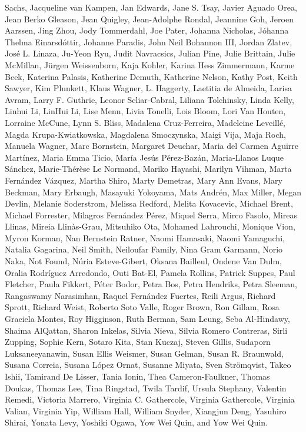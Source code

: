 \documentclass[
]{article}
\begin{document}
Sachs, Jacqueline van Kampen, Jan Edwards, Jane S. Tsay, Javier Aguado
Orea, Jean Berko Gleason, Jean Quigley, Jean-Adolphe Rondal, Jeannine
Goh, Jeroen Aarssen, Jing Zhou, Jody Tommerdahl, Joe Pater, Johanna
Nicholas, Jóhanna Thelma Einarsdóttir, Johanne Paradis, John Neil
Bohannon III, Jordan Zlatev, José L. Linaza, Ju-Yeon Ryu, Judit
Navracsics, Julian Pine, Julie Brittain, Julie McMillan, Jürgen
Weissenborn, Kaja Kohler, Karina Hess Zimmermann, Karme Beek, Katerina
Palasis, Katherine Demuth, Katherine Nelson, Kathy Post, Keith Sawyer,
Kim Plunkett, Klaus Wagner, L. Haggerty, Laetitia de Almeida, Larisa
Avram, Larry F. Guthrie, Leonor Scliar-Cabral, Liliana Tolchinsky, Linda
Kelly, Linhui Li, LinHui Li, Lise Menn, Livia Tonelli, Lois Bloom, Lori
Van Houten, Lorraine McCune, Lynn S. Bliss, Madalena Cruz-Ferreira,
Madeleine Leveillé, Magda Krupa-Kwiatkowska, Magdalena Smoczynska, Maigi
Vija, Maja Roch, Manuela Wagner, Marc Bornstein, Margaret Deuchar, Maria
del Carmen Aguirre Martínez, Maria Emma Ticio, María Jesús Pérez-Bazán,
Maria-Llanos Luque Sánchez, Marie-Thérèse Le Normand, Mariko Hayashi,
Marilyn Vihman, Marta Fernández Vázquez, Martha Shiro, Marty Demetras,
Mary Ann Evans, Mary Beckman, Mary Erbaugh, Masayuki Yokoyama, Mats
Andrén, Max Miller, Megan Devlin, Melanie Soderstrom, Melissa Redford,
Melita Kovacevic, Michael Brent, Michael Forrester, Milagros Fernández
Pérez, Miquel Serra, Mirco Fasolo, Mireas Llinas, Mireia Llinàs-Grau,
Mitsuhiko Ota, Mohamed Lahrouchi, Monique Vion, Myron Korman, Nan
Bernstein Ratner, Naomi Hamasaki, Naomi Yamaguchi, Natalia Gagarina,
Neil Smith, Neiloufar Family, Nina Gram Garmann, Norio Naka, Not Found,
Núria Esteve-Gibert, Oksana Bailleul, Ondene Van Dulm, Oralia Rodríguez
Arredondo, Outi Bat-El, Pamela Rollins, Patrick Suppes, Paul Fletcher,
Paula Fikkert, Péter Bodor, Petra Bos, Petra Hendriks, Petra Sleeman,
Rangaswamy Narasimhan, Raquel Fernández Fuertes, Reili Argus, Richard
Sprott, Richard Weist, Roberto Soto Valle, Roger Brown, Ron Gillam, Rosa
Graciela Montes, Roy Higginson, Ruth Berman, Sam Leung, Seba Al-Hindawy,
Shaima AlQattan, Sharon Inkelas, Silvia Nieva, Silvia Romero Contreras,
Sirli Zupping, Sophie Kern, Sotaro Kita, Stan Kuczaj, Steven Gillis,
Sudaporn Luksaneeyanawin, Susan Ellis Weismer, Susan Gelman, Susan R.
Braunwald, Susana Correia, Susana López Ornat, Susanne Miyata, Sven
Strömqvist, Takeo Ishii, Tamirand De Lisser, Tania Ionin, Thea
Cameron-Faulkner, Thomas Doukas, Thomas Lee, Tina Ringstad, Twila
Tardif, Ursula Stephany, Valentin Remedi, Victoria Marrero, Virginia C.
Gathercole, Virginia Gathercole, Virginia Valian, Virginia Yip, William
Hall, William Snyder, Xiangjun Deng, Yasuhiro Shirai, Yonata Levy,
Yoshiki Ogawa, Yow Wei Quin, and Yow Wei Quin.
\end{document}
